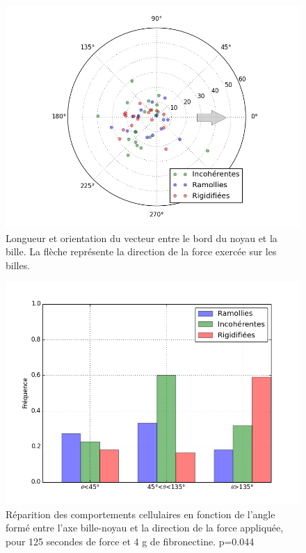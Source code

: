 \begin{figure}
\includegraphics[scale=0.5]{Figures/Positions_FRI.png} 
\caption{Longueur et orientation du vecteur entre le bord du noyau et la bille. La flèche représente la direction de la force exercée sur les billes.\label{polar}}
\end{figure}
\begin{figure}[p]
\includegraphics[scale=0.5]{Figures/Hist_Angles.png} 
\caption{Réparition des comportements cellulaires en fonction de l'angle formé entre l'axe bille-noyau et la direction de la force appliquée, pour 125 secondes de force et 4 \micro g de fibronectine. p=0.044 \label{Angle_C4}}
\end{figure}
